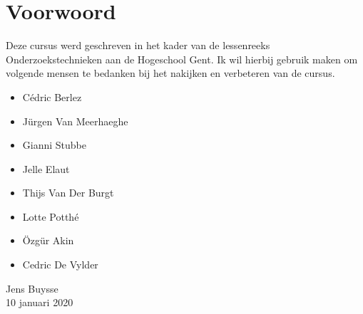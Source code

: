 

\chapter*{Voorwoord}
Deze cursus werd geschreven in het kader van de lessenreeks Onderzoekstechnieken aan de Hogeschool Gent. Ik wil hierbij gebruik maken om volgende mensen te bedanken bij het nakijken en verbeteren van de cursus.
\begin{itemize}
	\item C\'edric Berlez
	\item J\"urgen Van Meerhaeghe
	\item Gianni Stubbe
	\item Jelle Elaut
	\item Thijs Van Der Burgt
	\item Lotte Potth\'e
	\item \"Ozg\"ur Akin
	\item Cedric De Vylder
\end{itemize}

\bigskip \bigskip
{\raggedleft	%
Jens Buysse\\
10 januari 2020\\
}
